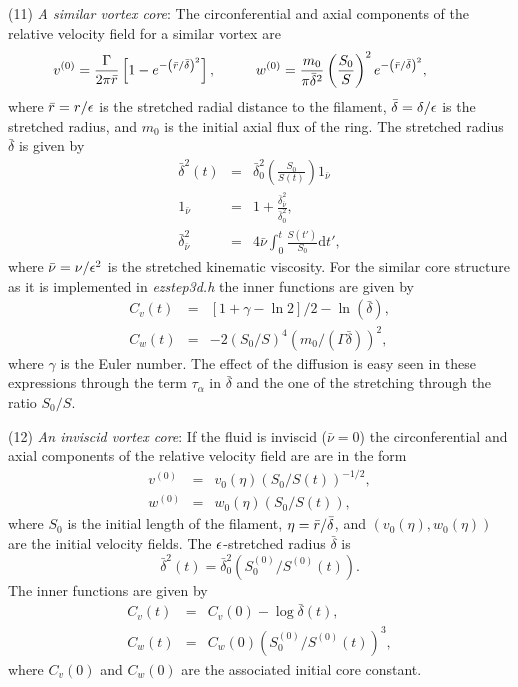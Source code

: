 \begin{list}{dummy}
\begin{list}{dummy}
\item[(11)]{\it A similar vortex core}: The circonferential and axial components of the relative velocity field for a similar vortex are 
	\begin{eqnarray}
	v^{(0)} = \frac{\Gamma}{2 \pi \bar r}\left[1-e^{-\left({\bar r}/{\bar{\delta}}\right)^2}\right],\nonumber\hskip 1 cm 
	w^{(0)} = \frac{m_0}{\pi{\bar{\delta}}^2 }\left(\frac{S_0}{S}\right)^2e^{-\left({\bar r}/{\bar{\delta}}\right)^2},\hskip 1 cm
	\end{eqnarray}
where $\bar{r}=r/\epsilon$ is the stretched radial distance to the filament, $\bar{\delta}=\delta/\epsilon$ is  the stretched radius, and $m_0$ is the initial axial flux of the ring. The stretched radius $\bar{\delta}$ is given by 
%
\begin{eqnarray} 
     \bar{\delta}^2(t)&=&\bar{\delta}_0^2\left(\frac{S_0}{S(t)}\right)1_{\bar \nu}\nonumber\\
        1_{\bar \nu}&=&1+\frac{\bar{\delta}_{\bar \nu}^2}{\bar{\delta}_0^2},\nonumber\\
           \bar{\delta}_{\bar \nu}^2&=&4\bar{\nu}\int_0^t
                     \frac{S(t')}{S_0}\mbox{d}t',\nonumber
\end{eqnarray}
%
where ${\bar \nu}=\nu/\epsilon^2$ is the stretched kinematic viscosity. For the similar core structure as it is implemented in {\it ezstep3d.h} the inner functions are given by
%
\begin{eqnarray} 
C_v(t)&=&[1+\gamma-\ln2]/2-\ln(\bar{\delta}),\nonumber\\
C_w(t)&=&-2(S_0/S)^4(m_0/(\Gamma\bar{\delta}))^2,\nonumber
\end{eqnarray} 
%
 where $\gamma$ is the Euler number. The effect of the diffusion is easy seen in these expressions through the term $\tau_{\alpha}$ in $\bar{\delta}$ and the one of the stretching through the ratio $S_0/S$. 

\item[(12)]{\it An inviscid vortex core}:
  If the fluid is inviscid ($\bar \nu=0$)  the  circonferential and axial components of the relative velocity field are are in the form
%
\begin{eqnarray} 
         v^{(0)}&=&{v}_0(\eta)\left(S_0/S(t)\right)^{-1/2},\nonumber\\
         w^{(0)}&=&{w}_0(\eta)\left(S_0/S(t)\right),\nonumber
\end{eqnarray}
%
where $S_0$ is the initial length of the filament, $\eta=\bar r/\bar{\delta}$, and $({v}_0(\eta),{w}_0(\eta))$ are the initial velocity fields. The  $\epsilon$-stretched radius $\bar{\delta}$ is 
%
$$\bar{\delta}^2(t)=\bar{\delta}_0^2\left(S_0^{(0)}/S^{(0)}(t)\right).$$
The inner functions are given by
%
\begin{eqnarray} 
        C_v(t)&=&C_v(0)-\log\bar{\delta}(t),\nonumber\\
        C_w(t)&=&C_w(0)\left(S_0^{(0)}/S^{(0)}(t)\right)^3,\nonumber
\end{eqnarray}
%
where $C_v(0)$ and $C_w(0)$ are the associated initial core constant. 


\end{list}
\end{list}

